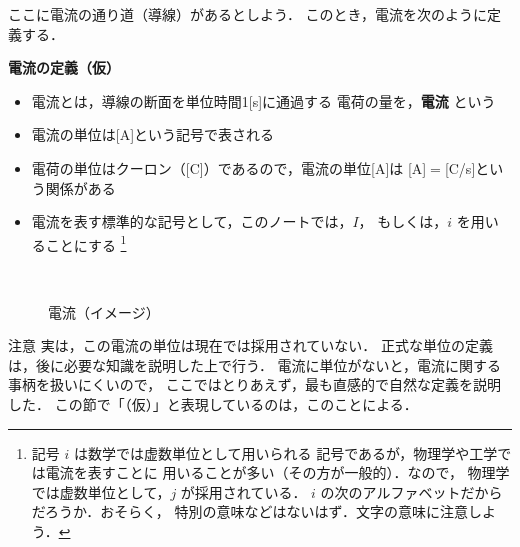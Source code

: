         ここに電流の通り道（導線）があるとしよう．
        このとき，電流を次のように定義する．
        \\
        \begin{itembox}[l]{\textbf{電流の定義（仮）}}
            \begin{itemize}
                \item 電流とは，導線の断面を単位時間1[s]に通過する
                      電荷の量を，\textbf{電流} という
                \item 電流の単位は[A]という記号で表される
                \item 電荷の単位はクーロン（[C]）であるので，電流の単位[A]は
                      [A]$=$[C/s]という関係がある
                \item 電流を表す標準的な記号として，このノートでは，$I$，
                      もしくは，$i$ を用いることにする
                        \footnote{
                            記号 $i$ は数学では虚数単位として用いられる
                            記号であるが，物理学や工学では電流を表すことに
                            用いることが多い（その方が一般的）．なので，
                            物理学では虚数単位として，$j$ が採用されている．
                            $i$ の次のアルファベットだからだろうか．おそらく，
                            特別の意味などはないはず．文字の意味に注意しよう．
                        }
            \end{itemize}
        \end{itembox}
        \\
        \begin{figure}[hbt]
            \begin{center}
                \caption{電流（イメージ）}
                \label{fig:EM_Denryu}
            \end{center}
        \end{figure}

    \begin{memo}{注意}
        実は，この電流の単位は現在では採用されていない．
        正式な単位の定義は，後に必要な知識を説明した上で行う．
        電流に単位がないと，電流に関する事柄を扱いにくいので，
        ここではとりあえず，最も直感的で自然な定義を説明した．
        この節で「（仮）」と表現しているのは，このことによる．
    \end{memo}

